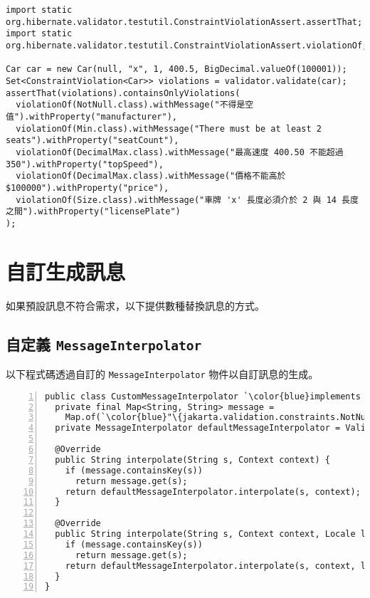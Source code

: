 \begin{lstlisting}[basicstyle=\linespread{1}\ttfamily\scriptsize]
import static org.hibernate.validator.testutil.ConstraintViolationAssert.assertThat;
import static org.hibernate.validator.testutil.ConstraintViolationAssert.violationOf;

Car car = new Car(null, "x", 1, 400.5, BigDecimal.valueOf(100001));
Set<ConstraintViolation<Car>> violations = validator.validate(car);
assertThat(violations).containsOnlyViolations(
  violationOf(NotNull.class).withMessage("不得是空值").withProperty("manufacturer"),
  violationOf(Min.class).withMessage("There must be at least 2 seats").withProperty("seatCount"),
  violationOf(DecimalMax.class).withMessage("最高速度 400.50 不能超過 350").withProperty("topSpeed"),
  violationOf(DecimalMax.class).withMessage("價格不能高於 $100000").withProperty("price"),
  violationOf(Size.class).withMessage("車牌 'x' 長度必須介於 2 與 14 長度之間").withProperty("licensePlate")
);
\end{lstlisting}

\section{自訂生成訊息}

如果預設訊息不符合需求，以下提供數種替換訊息的方式。

\subsection{自定義 \texttt{MessageInterpolator}}

以下程式碼透過自訂的 \texttt{MessageInterpolator} 物件以自訂訊息的生成。

\begin{lstlisting}[numbers=left, basicstyle=\linespread{1}\ttfamily\scriptsize, xleftmargin=1.5\parindent]
public class CustomMessageInterpolator `\color{blue}implements MessageInterpolator` {
  private final Map<String, String> message =
    Map.of(`\color{blue}"\{jakarta.validation.constraints.NotNull.message\}"`, `\color{blue}"請提供資料"`);
  private MessageInterpolator defaultMessageInterpolator = Validation.byDefaultProvider().configure().getDefaultMessageInterpolator();

  @Override
  public String interpolate(String s, Context context) {
    if (message.containsKey(s))
      return message.get(s);
    return defaultMessageInterpolator.interpolate(s, context);
  }

  @Override
  public String interpolate(String s, Context context, Locale locale) {
    if (message.containsKey(s))
      return message.get(s);
    return defaultMessageInterpolator.interpolate(s, context, locale);
  }
}
\end{lstlisting}

